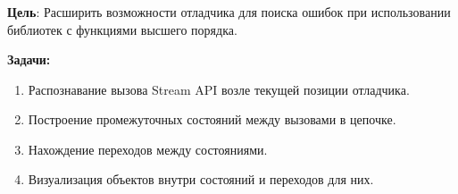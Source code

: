 \begin{frame}
	\frametitle{\insertsection} 
	\framesubtitle{\insertsubsection}
	\textbf{Цель}: Расширить возможности отладчика для поиска ошибок при использовании библиотек с функциями высшего порядка.
	
	\vspace{10px}
	\textbf{Задачи:}
	\begin{enumerate}
		\item Распознавание вызова Stream API возле текущей позиции отладчика.
		\item Построение промежуточных состояний между вызовами в цепочке.
		\item Нахождение переходов между состояниями.
		\item Визуализация объектов внутри состояний и переходов для них.
	\end{enumerate}
\end{frame}
